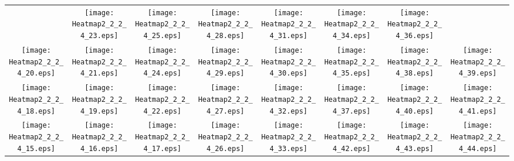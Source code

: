 \documentclass{standalone}
\begin{document}
\renewcommand{\arraystretch}{0}
\setlength{\tabcolsep}{0pt}
\begin{tabular}{ *8{c} }
 & \texttt{[image: Heatmap2\_2\_2\_4\_23.eps]} & \texttt{[image: Heatmap2\_2\_2\_4\_25.eps]} & \texttt{[image: Heatmap2\_2\_2\_4\_28.eps]} & \texttt{[image: Heatmap2\_2\_2\_4\_31.eps]} & \texttt{[image: Heatmap2\_2\_2\_4\_34.eps]} & \texttt{[image: Heatmap2\_2\_2\_4\_36.eps]} &  \\
\texttt{[image: Heatmap2\_2\_2\_4\_20.eps]} & \texttt{[image: Heatmap2\_2\_2\_4\_21.eps]} & \texttt{[image: Heatmap2\_2\_2\_4\_24.eps]} & \texttt{[image: Heatmap2\_2\_2\_4\_29.eps]} & \texttt{[image: Heatmap2\_2\_2\_4\_30.eps]} & \texttt{[image: Heatmap2\_2\_2\_4\_35.eps]} & \texttt{[image: Heatmap2\_2\_2\_4\_38.eps]} & \texttt{[image: Heatmap2\_2\_2\_4\_39.eps]} \\
\texttt{[image: Heatmap2\_2\_2\_4\_18.eps]} & \texttt{[image: Heatmap2\_2\_2\_4\_19.eps]} & \texttt{[image: Heatmap2\_2\_2\_4\_22.eps]} & \texttt{[image: Heatmap2\_2\_2\_4\_27.eps]} & \texttt{[image: Heatmap2\_2\_2\_4\_32.eps]} & \texttt{[image: Heatmap2\_2\_2\_4\_37.eps]} & \texttt{[image: Heatmap2\_2\_2\_4\_40.eps]} & \texttt{[image: Heatmap2\_2\_2\_4\_41.eps]} \\
\texttt{[image: Heatmap2\_2\_2\_4\_15.eps]} & \texttt{[image: Heatmap2\_2\_2\_4\_16.eps]} & \texttt{[image: Heatmap2\_2\_2\_4\_17.eps]} & \texttt{[image: Heatmap2\_2\_2\_4\_26.eps]} & \texttt{[image: Heatmap2\_2\_2\_4\_33.eps]} & \texttt{[image: Heatmap2\_2\_2\_4\_42.eps]} & \texttt{[image: Heatmap2\_2\_2\_4\_43.eps]} & \texttt{[image: Heatmap2\_2\_2\_4\_44.eps]} \\

\end{tabular}
\end{document}
